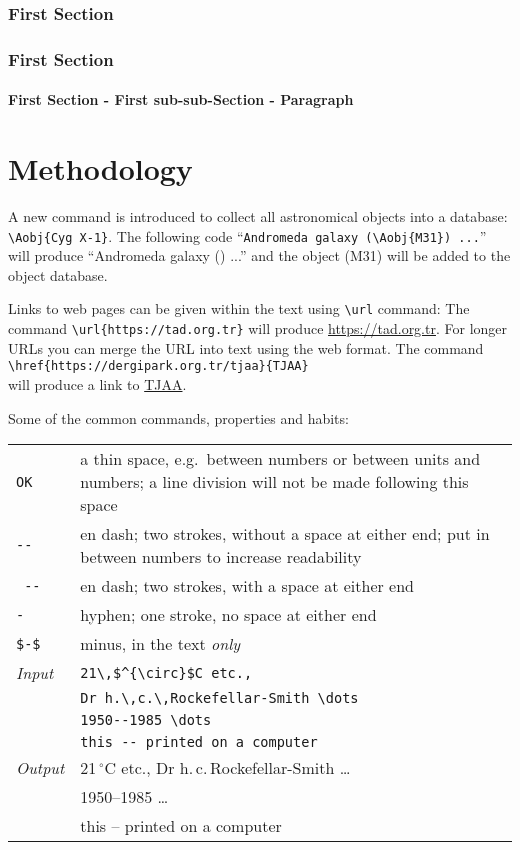 \documentclass[usenatbib]{tjaa}
\begin{document}
\subsubsection{First Section}
\subsubsection{First Section}
\paragraph{First Section - First sub-sub-Section - Paragraph}
\lipsum[1]

\newpage
\section{Methodology}

A new command is introduced to collect all astronomical objects into a
database:
\verb|\Aobj{Cyg X-1}|.
The following code
``\verb|Andromeda galaxy (\Aobj{M31}) ...|''
will produce
``Andromeda galaxy () ...''
and the object (M31) will be added to the object database.

Links to web pages can be given within the text using \verb|\url| command:
The command \verb|\url{https://tad.org.tr}| will produce
\url{https://tad.org.tr}.
For longer URLs you can merge the URL into text using the web format.
The command
\verb|\href{https://dergipark.org.tr/tjaa}{TJAA}|\\
will produce a link to \href{https://dergipark.org.tr/tjaa}{TJAA}.

Some of the common commands, properties and habits:
\begin{flushleft}
\begin{tabular}{@{}p{}p{}}
\verb|OK|   & a thin space, e.g.\ between numbers or between units
              and numbers; a line division will not be made
              following this space\\
\verb|--|   & en dash; two strokes, without a space at either end;
	      put in between numbers to increase readability\\
\verb*| -- |& en dash; two strokes, with  a space at either end\\
\verb|-|    & hyphen; one stroke, no space at either end\\
\verb|$-$|  & minus, in the text {\em only} \\
{\em Input} & \verb|21\,$^{\circ}$C etc.,|\\
            & \verb|Dr h.\,c.\,Rockefellar-Smith \dots|\\
            & \verb|1950--1985 \dots|\\
            & \verb|this -- printed on a computer|\\
{\em Output}& 21\,$^{\circ}$C etc., Dr h.\,c.\,Rockefellar-Smith \dots\\
            & 1950--1985 \dots\\
            & this -- printed on a computer
\end{tabular}
\end{flushleft}
\end{document}
